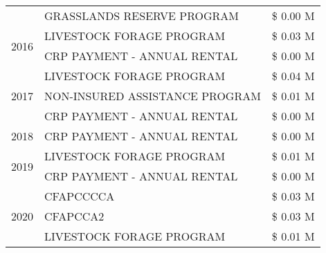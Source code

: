 \begin{tabular}{llr}
 & GRASSLANDS RESERVE PROGRAM & \$ 0.00 M \\
\cline{1-3}
\multirow[t]{2}{*}{2016} & LIVESTOCK FORAGE PROGRAM                      & \$ 0.03 M \\
 & CRP PAYMENT - ANNUAL RENTAL                   & \$ 0.00 M \\
\cline{1-3}
\multirow[t]{3}{*}{2017} & LIVESTOCK FORAGE PROGRAM & \$ 0.04 M \\
 & NON-INSURED ASSISTANCE PROGRAM & \$ 0.01 M \\
 & CRP PAYMENT - ANNUAL RENTAL & \$ 0.00 M \\
\cline{1-3}
2018 & CRP PAYMENT - ANNUAL RENTAL & \$ 0.00 M \\
\cline{1-3}
\multirow[t]{2}{*}{2019} & LIVESTOCK FORAGE PROGRAM & \$ 0.01 M \\
 & CRP PAYMENT - ANNUAL RENTAL & \$ 0.00 M \\
\cline{1-3}
\multirow[t]{3}{*}{2020} & CFAPCCCCA & \$ 0.03 M \\
 & CFAPCCA2 & \$ 0.03 M \\
 & LIVESTOCK FORAGE PROGRAM & \$ 0.01 M \\
\cline{1-3}
\bottomrule
\end{tabular}
